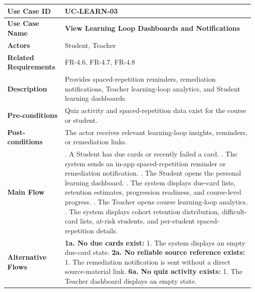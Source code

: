 \begin{longtable}{|>{\raggedright\arraybackslash}p{}|>{\raggedright\arraybackslash}p{}|}
\textbf{Use Case ID} & \textbf{UC-LEARN-03} \\ \hline
\textbf{Use Case Name} & \textbf{View Learning Loop Dashboards and Notifications} \\ \hline
\textbf{Actors} & Student, Teacher \\ \hline
\textbf{Related Requirements} & FR-4.6, FR-4.7, FR-4.8 \\ \hline
\textbf{Description} & Provides spaced-repetition reminders, remediation notifications, Teacher learning-loop analytics, and Student learning dashboards. \\ \hline
\textbf{Pre-conditions} & Quiz activity and spaced-repetition data exist for the course or student. \\ \hline
\textbf{Post-conditions} & The actor receives relevant learning-loop insights, reminders, or remediation links. \\ \hline
\textbf{Main Flow} &
1. A Student has due cards or recently failed a card. \newline
2. The system sends an in-app spaced-repetition reminder or remediation notification. \newline
3. The Student opens the personal learning dashboard. \newline
4. The system displays due-card lists, retention estimates, progression readiness, and course-level progress. \newline
5. The Teacher opens course learning-loop analytics. \newline
6. The system displays cohort retention distribution, difficult-card lists, at-risk students, and per-student spaced-repetition details. \\ \hline
\textbf{Alternative Flows} &
\textbf{1a. No due cards exist:} \newline
\hspace*{1em}1. The system displays an empty due-card state. \newline
\textbf{2a. No reliable source reference exists:} \newline
\hspace*{1em}1. The remediation notification is sent without a direct source-material link. \newline
\textbf{6a. No quiz activity exists:} \newline
\hspace*{1em}1. The Teacher dashboard displays an empty state. \\
\end{longtable}



